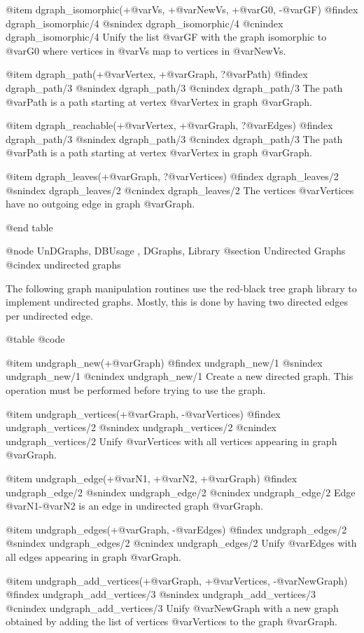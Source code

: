 {{{{{{{{{@item dgraph_isomorphic(+@var{Vs}, +@var{NewVs}, +@var{G0}, -@var{GF})
@findex  dgraph_isomorphic/4
@snindex dgraph_isomorphic/4
@cnindex dgraph_isomorphic/4
Unify the list @var{GF} with the graph isomorphic to @var{G0} where 
vertices in @var{Vs} map to vertices in @var{NewVs}.

@item dgraph_path(+@var{Vertex}, +@var{Graph}, ?@var{Path})
@findex  dgraph_path/3
@snindex dgraph_path/3
@cnindex dgraph_path/3
The path @var{Path} is a path starting at vertex @var{Vertex} in graph
@var{Graph}.

@item dgraph_reachable(+@var{Vertex}, +@var{Graph}, ?@var{Edges})
@findex  dgraph_path/3
@snindex dgraph_path/3
@cnindex dgraph_path/3
The path @var{Path} is a path starting at vertex @var{Vertex} in graph
@var{Graph}.

@item dgraph_leaves(+@var{Graph}, ?@var{Vertices})
@findex  dgraph_leaves/2
@snindex dgraph_leaves/2
@cnindex dgraph_leaves/2
The vertices @var{Vertices} have no outgoing edge in graph
@var{Graph}.

@end table

@node UnDGraphs, DBUsage , DGraphs, Library
@section Undirected Graphs
@cindex undirected graphs

The following graph manipulation routines use the red-black tree graph
library to implement undirected graphs. Mostly, this is done by having
two directed edges per undirected edge.

@table @code

@item undgraph_new(+@var{Graph})
@findex  undgraph_new/1
@snindex undgraph_new/1
@cnindex undgraph_new/1
Create a new directed graph. This operation must be performed before
trying to use the graph.

@item undgraph_vertices(+@var{Graph}, -@var{Vertices})
@findex  undgraph_vertices/2
@snindex undgraph_vertices/2
@cnindex undgraph_vertices/2
Unify @var{Vertices} with all vertices appearing in graph
@var{Graph}.

@item undgraph_edge(+@var{N1}, +@var{N2}, +@var{Graph})
@findex  undgraph_edge/2
@snindex undgraph_edge/2
@cnindex undgraph_edge/2
Edge @var{N1}-@var{N2} is an edge in undirected graph @var{Graph}.

@item undgraph_edges(+@var{Graph}, -@var{Edges})
@findex  undgraph_edges/2
@snindex undgraph_edges/2
@cnindex undgraph_edges/2
Unify @var{Edges} with all edges appearing in graph
@var{Graph}.

@item undgraph_add_vertices(+@var{Graph}, +@var{Vertices}, -@var{NewGraph})
@findex  undgraph_add_vertices/3
@snindex undgraph_add_vertices/3
@cnindex undgraph_add_vertices/3
Unify @var{NewGraph} with a new graph obtained by adding the list of
vertices @var{Vertices} to the graph @var{Graph}.

}}}}}}}}}
